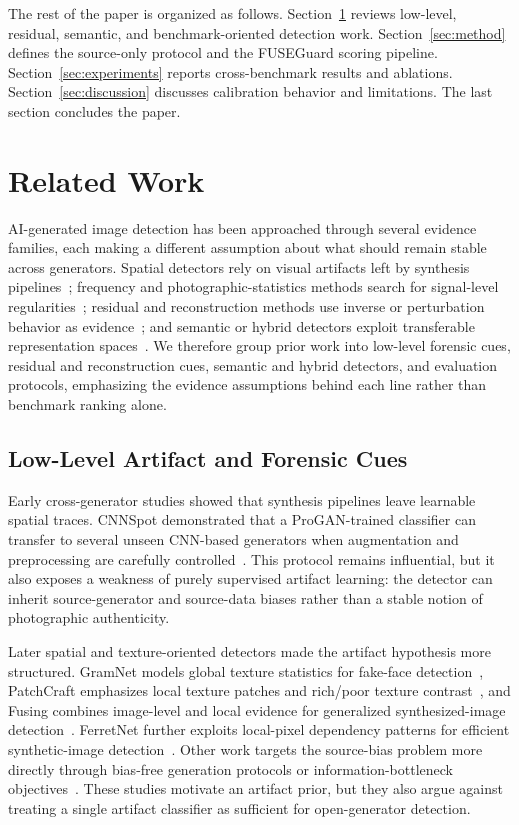 \documentclass[lettersize,journal]{IEEEtran}
\begin{document}
The rest of the paper is organized as follows. Section~\ref{sec:related_work} reviews low-level, residual, semantic, and benchmark-oriented detection work. Section~\ref{sec:method} defines the source-only protocol and the FUSEGuard scoring pipeline. Section~\ref{sec:experiments} reports cross-benchmark results and ablations. Section~\ref{sec:discussion} discusses calibration behavior and limitations. The last section concludes the paper.

\section{Related Work}
\label{sec:related_work}

AI-generated image detection has been approached through several evidence families, each making a different assumption about what should remain stable across generators. Spatial detectors rely on visual artifacts left by synthesis pipelines~\cite{wang2020cnnspot,liu2020gramnet,zhong2023patchcraft}; frequency and photographic-statistics methods search for signal-level regularities~\cite{frank2020frequency,liu2022realimages,zhong2025beyond}; residual and reconstruction methods use inverse or perturbation behavior as evidence~\cite{tan2023lgrad,tan2024npr,wang2023dire}; and semantic or hybrid detectors exploit transferable representation spaces~\cite{radford2021clip,ojha2023univfd,yan2025aide,cheng2025cospy}. We therefore group prior work into low-level forensic cues, residual and reconstruction cues, semantic and hybrid detectors, and evaluation protocols, emphasizing the evidence assumptions behind each line rather than benchmark ranking alone.

\subsection{Low-Level Artifact and Forensic Cues}
Early cross-generator studies showed that synthesis pipelines leave learnable spatial traces. CNNSpot demonstrated that a ProGAN-trained classifier can transfer to several unseen CNN-based generators when augmentation and preprocessing are carefully controlled~\cite{wang2020cnnspot}. This protocol remains influential, but it also exposes a weakness of purely supervised artifact learning: the detector can inherit source-generator and source-data biases rather than a stable notion of photographic authenticity.

Later spatial and texture-oriented detectors made the artifact hypothesis more structured. GramNet models global texture statistics for fake-face detection~\cite{liu2020gramnet}, PatchCraft emphasizes local texture patches and rich/poor texture contrast~\cite{zhong2023patchcraft}, and Fusing combines image-level and local evidence for generalized synthesized-image detection~\cite{ju2022fusing}. FerretNet further exploits local-pixel dependency patterns for efficient synthetic-image detection~\cite{liang2025ferretnet}. Other work targets the source-bias problem more directly through bias-free generation protocols or information-bottleneck objectives~\cite{guillaro2025biasfree,zhang2025vibnet}. These studies motivate an artifact prior, but they also argue against treating a single artifact classifier as sufficient for open-generator detection.
\end{document}

